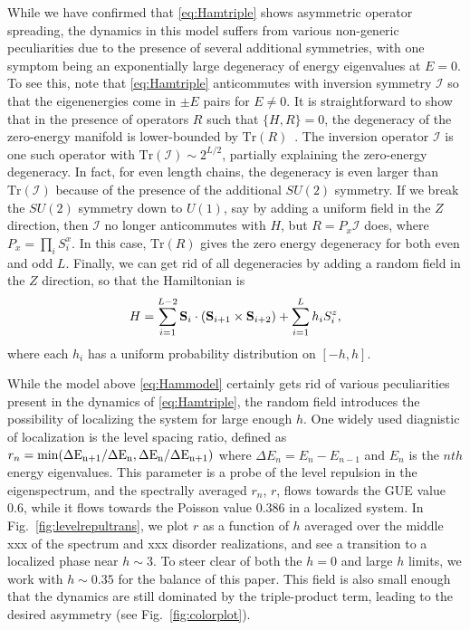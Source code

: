 \documentclass[aps,prx,reprint,superscriptaddress, longbibliography]{revtex4-1}
\newcommand{\vedika}[1]{ {\color{red} {{#1}}}}
\begin{document}
While we have confirmed that \eqref{eq:Hamtriple} shows asymmetric operator spreading, the dynamics in this model suffers from various non-generic peculiarities due to the presence of several additional symmetries, with one symptom being an exponentially large degeneracy of energy eigenvalues at $E=0$. To see this, note that \eqref{eq:Hamtriple} anticommutes with inversion symmetry $\mathcal{I}$ so that the eigenenergies come in $\pm E$ pairs for $E\neq0$. It is straightforward to show that in the presence of operators $R$ such that $\{H, R\}=0$, the degeneracy of the zero-energy manifold is lower-bounded by $\mbox{Tr}(R)$~\cite{IadecolaFSUSY}. The inversion operator $\mathcal{I}$ is one such operator with $\mbox{Tr}(\mathcal{I}) \sim 2^{L/2}$, partially explaining the zero-energy degeneracy. In fact, for even length chains, the degeneracy is even larger than $\mbox{Tr}(\mathcal{I})$ because of the presence of the additional $SU(2)$ symmetry. If we break the $SU(2)$ symmetry down to $U(1)$, say by adding a uniform field in the $Z$ direction, then $\mathcal{I}$ no longer anticommutes with $H$, but $R = P_x \mathcal I $ does, where $P_x = \prod_i S_i^x$. In this case, $\mbox{Tr}(R)$ gives the zero energy degeneracy for both even and odd $L$. Finally, we can get rid of all degeneracies by adding a random field in the $Z$ direction, so that the Hamiltonian is 
\begin{align}
H = \sum_{i=1}^{L-2}{\bf S}_i\cdot({\bf S}_{i+1}\times {\bf S}_{i+2}) + 
\sum_{i=1}^{L}h_iS_i^z,
\label{eq:Hammodel}
\end{align}
where each $h_i$ has a uniform probability distribution on $[-h,h]$. 

While the model above \eqref{eq:Hammodel} certainly gets rid of various peculiarities present in the dynamics of \eqref{eq:Hamtriple}, the random field introduces the possibility of localizing the system for large enough $h$. One widely used diagnistic of localization is the level spacing ratio, defined as $r_n = \rm{min}(\Delta E_{n+1}/\Delta E_n,\Delta E_{n}/\Delta E_{n+1})$ where $\Delta E_n = E_n - E_{n-1}$ and $E_n$ is the $nth$ energy eigenvalues. This parameter is a probe of the level repulsion in the eigenspectrum, and the spectrally averaged $r_n$, $r$, flows towards the GUE value $0.6$, while it flows towards the Poisson value $0.386$ in a localized system. 
In Fig.~\ref{fig:levelrepultrans}, we plot $r$ as a function of $h$ \vedika{averaged over the middle xxx of the spectrum and xxx disorder realizations}, and see a transition to a localized phase near $h \sim 3$. To steer clear of both the $h=0$ and large $h$ limits, we work with $h \sim 0.35$ for the balance of this paper. This field is also small enough that the dynamics are still dominated by the triple-product term, leading to the desired asymmetry (see Fig.~\ref{fig:colorplot}). 
\end{document}
